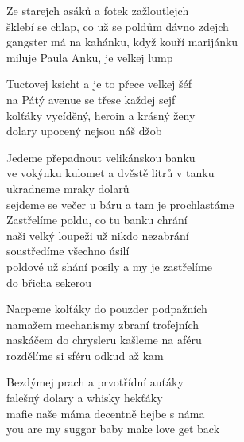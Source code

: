 
\ve{}
Ze starejch asáků a fotek zažloutlejch\\
šklebí se chlap, co už se poldům dávno zdejch\\
gangster má na kahánku, když kouří marijánku\\
miluje Paula Anku, je velkej lump
 
\ve{}
Tuctovej ksicht a je to přece velkej šéf\\
na Pátý avenue se třese každej sejf\\
kolťáky vycíděný, heroin a krásný ženy\\
dolary upocený nejsou náš džob
 
\cho{}
Jedeme přepadnout velikánskou banku\\
ve vokýnku kulomet a dvěstě litrů v tanku\\
ukradneme mraky dolarů\\
sejdeme se večer u báru a tam je prochlastáme\\
Zastřelíme poldu, co tu banku chrání\\
naši velký loupeži už nikdo nezabrání\\
soustředíme všechno úsilí\\
poldové už shání posily a my je zastřelíme\\
do břicha sekerou 
 
\ve{}
Nacpeme kolťáky do pouzder podpažních\\
namažem mechanismy zbraní trofejních\\
naskáčem do chrysleru kašleme na aféru\\
rozdělíme si sféru odkud až kam
 
\ve{}
Bezdýmej prach a prvotřídní auťáky\\
falešný dolary a whisky hekťáky\\
mafie naše máma decentně hejbe s náma\\
you are my suggar baby make love get back
 
\cho{}

\esong{}